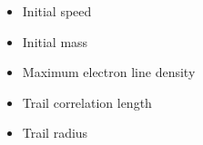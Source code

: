 \begin{frame}[t, label=gen_pop]
\begin{columns}
\begin{column}{0.45\textwidth}
            {\setlength{\leftmargini}{1em} \footnotesize \begin{itemize}
                \item<alert@7> \alert<12>{Initial speed} 
                \item<alert@8> \alert<12>{Initial mass} 
                \item<alert@9> Maximum electron line density %
                \item<alert@10> Trail correlation length %
                \item<alert@11> Trail radius %
            \end{itemize}}
        \end{column}
        \begin{column}{0.6\textwidth}
            
        \end{column}
    \end{columns} 
    
\end{frame}
